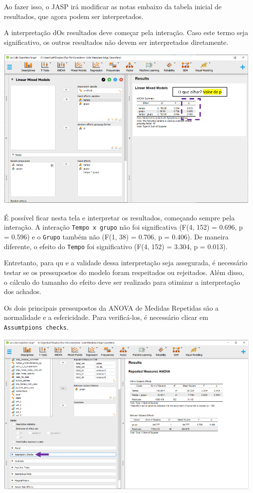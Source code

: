 \documentclass[
]{book}
\begin{document}
Ao fazer isso, o JASP irá modificar as notas embaixo da tabela inicial de resultados, que agora podem ser interpretados.

A interpretação dOs resultados deve começar pela interação. Caso este termo seja significativo, os outros resultados não devem ser interpretados diretamente.

\includegraphics{./img/cap_lmm_resultados.png}

É possível ficar nesta tela e interpretar os resultados, começando sempre pela interação. A interação \texttt{Tempo\ x\ grupo} não foi significativa (F(4, 152) = 0.696, p = 0.596) e o \texttt{Grupo} também não (F(1, 38) = 0.706, p = 0.406). De maneira diferente, o efeito do \texttt{Tempo} foi significativo (F(4, 152) = 3.304, p = 0.013).

Entretanto, para qu e a validade dessa interpretação seja assegurada, é necessário testar se os pressupostos do modelo foram respeitados ou rejeitados. Além disso, o cálculo do tamanho do efeito deve ser realizado para otimizar a interpretação dos achados.

Os dois principais pressupostos da ANOVA de Medidas Repetidas são a normalidade e a esfericidade. Para verificá-los, é necessário clicar em \texttt{Assumtpions\ checks}.

\includegraphics{./img/cap_anovarm_pressupostos.png}
\end{document}

